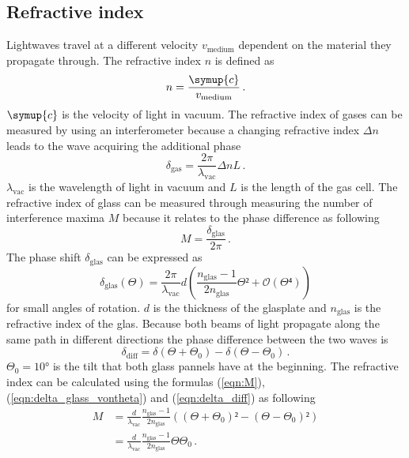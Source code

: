  \subsection{Refractive index}
 Lightwaves travel at a different velocity $v_{\text{medium}}$ dependent on the material they propagate through. 
 The refractive index $n$ is defined as 
 \begin{equation}
    n = \frac{\symup{c}}{v_{\text{medium}}} \label{n_generell} \, .
 \end{equation}
 $\symup{c}$ is the velocity of light in vacuum. 
 The refractive index of gases can be measured by using an interferometer because a changing refractive 
 index $\Delta n$ leads to the wave acquiring the additional phase 
 \begin{equation}
    \delta_{\text{gas}} = \frac{2 \pi}{\lambda_{\text{vac}}} \Delta n L \, . \label{eqn:delta_gas}
 \end{equation}
 $\lambda_{\text{vac}}$ is the wavelength of light in vacuum and $L$ is the length of the gas cell. 
 The refractive index of glass can be measured through measuring the number of interference maxima $M$
 because it relates to the phase difference as following 
 \begin{equation}
    M = \frac{\delta_{\text{glas}}}{2\pi} \label{eqn:M} \, .
 \end{equation}
 The phase shift $\delta_{\text{glas}}$ can be expressed as 
 \begin{equation}
    \delta_{\text{glas}}(\Theta) = \frac{2 \pi}{\lambda_{\text{vac}}} d \left( \frac{n_{\text{glas}}-1}{2n_{\text{glas}}} \Theta² + \mathcal{O}(\Theta⁴)\right) 
    \label{eqn:delta_glass_vontheta}
 \end{equation}
 for small angles of rotation. 
 $d$ is the thickness of the glasplate and $n_{\text{glas}}$ is the refractive index of the glas. 
 Because both beams of light propagate along the same path in different directions the phase difference between the two waves is 
 \begin{equation}
    \delta_{\text{diff}} = \delta(\Theta + \Theta_0) - \delta(\Theta - \Theta_0) \label{eqn:delta_diff} \, .
 \end{equation}
 $\Theta_0 = 10°$ is the tilt that both glass pannels have at the beginning. The refractive index can be calculated using 
 the formulas (\ref{eqn:M}), (\ref{eqn:delta_glass_vontheta}) and (\ref{eqn:delta_diff}) as following 
 \begin{align*}
    M &= \frac{d}{\lambda_{\text{vac}}} \frac{n_{\text{glas}}-1}{2n_{\text{glas}}} \left( (\Theta + \Theta_0)² - (\Theta - \Theta_0)²\right) \\
    &= \frac{d}{\lambda_{\text{vac}}} \frac{n_{\text{glas}}-1}{2n_{\text{glas}}} \Theta \Theta_0    
    \, . 
 \end{align*}
